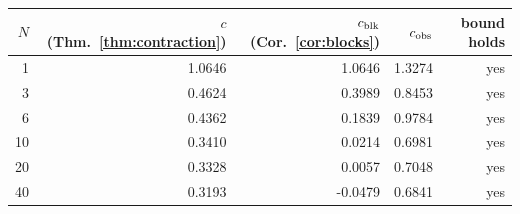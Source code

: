 \begin{tabular}{rrrrr}
\toprule
$N$ & $c$ (Thm.~\ref{thm:contraction}) & $c_{\rm blk}$ (Cor.~\ref{cor:blocks}) & $c_{\rm obs}$ & bound holds\\
\midrule
1 & 1.0646 & 1.0646 & 1.3274 & yes\\
3 & 0.4624 & 0.3989 & 0.8453 & yes\\
6 & 0.4362 & 0.1839 & 0.9784 & yes\\
10 & 0.3410 & 0.0214 & 0.6981 & yes\\
20 & 0.3328 & 0.0057 & 0.7048 & yes\\
40 & 0.3193 & -0.0479 & 0.6841 & yes\\
\bottomrule
\end{tabular}